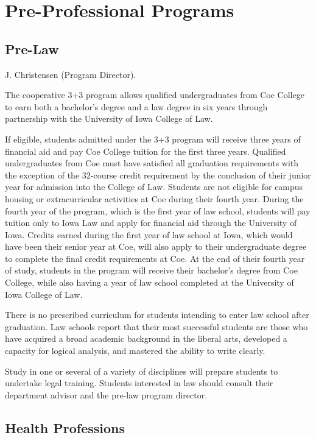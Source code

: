 \documentclass[
  letterpaper,
]{scrbook}
\begin{document}
\section{Pre-Professional Programs}\label{pre-professional-programs}

\subsection{Pre-Law}\label{pre-law}

J. Christensen (Program Director).

The cooperative 3+3 program allows qualified undergraduates from Coe
College to earn both a bachelor's degree and a law degree in six years
through partnership with the University of Iowa College of Law.

If eligible, students admitted under the 3+3 program will receive three
years of financial aid and pay Coe College tuition for the first three
years. Qualified undergraduates from Coe must have satisfied all
graduation requirements with the exception of the 32-course credit
requirement by the conclusion of their junior year for admission into
the College of Law. Students are not eligible for campus housing or
extracurricular activities at Coe during their fourth year. During the
fourth year of the program, which is the first year of law school,
students will pay tuition only to Iowa Law and apply for financial aid
through the University of Iowa. Credits earned during the first year of
law school at Iowa, which would have been their senior year at Coe, will
also apply to their undergraduate degree to complete the final credit
requirements at Coe. At the end of their fourth year of study, students
in the program will receive their bachelor's degree from Coe College,
while also having a year of law school completed at the University of
Iowa College of Law.

There is no prescribed curriculum for students intending to enter law
school after graduation. Law schools report that their most successful
students are those who have acquired a broad academic background in the
liberal arts, developed a capacity for logical analysis, and mastered
the ability to write clearly.

Study in one or several of a variety of disciplines will prepare
students to undertake legal training. Students interested in law should
consult their department advisor and the pre-law program director.

\subsection{Health Professions}\label{health-professions}
\end{document}
